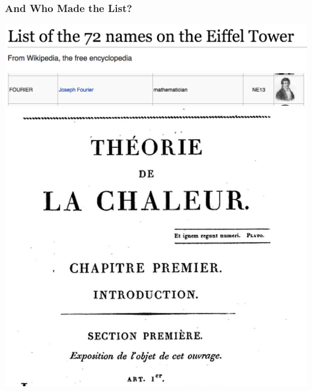 \documentclass[mathserif,9pt,handout]{beamer}
\begin{document}
\begin{frame}\frametitle{And Who Made the List?}\small
  \begin{center}
     \includegraphics[width=.9\textwidth]{F1.png}\hspace{1em} \\
     \includegraphics[width=.9\textwidth]{F2.png}\hspace{1em} \\
     \includegraphics[height=.4\textheight]{f3.png}\hspace{1em} 

\end{center}
\end{frame}
\end{document}
